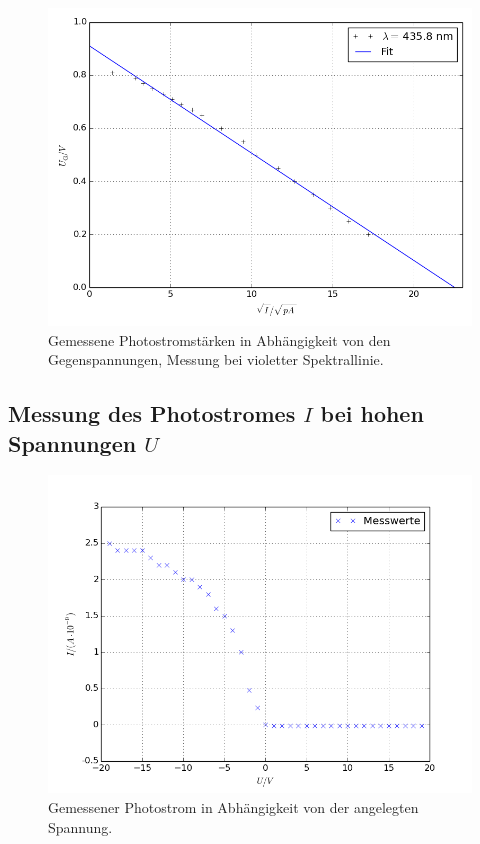 \begin{figure}[pt]
	\centering
	\includegraphics[width=\textwidth]{Bilder/Fit_violett.png}
	\caption{Gemessene Photostromstärken in Abhängigkeit von den Gegenspannungen, Messung bei violetter Spektrallinie.\cite{matplotlib}}
	\label{fig:uidiagramm2}
\end{figure}


\subsection{Messung des \texorpdfstring{Photostromes $I$}{Photostromes} bei hohen \texorpdfstring{Spannungen $U$}{Spannungen}}
\label{sec:Auswertung2}
\begin{figure}[h]
	\centering
	\includegraphics[width=\textwidth]{Bilder/messung2.png}
	\caption{Gemessener Photostrom in Abhängigkeit von der angelegten Spannung.\cite{matplotlib}}
	\label{fig:uidiagramm3}
\end{figure}

